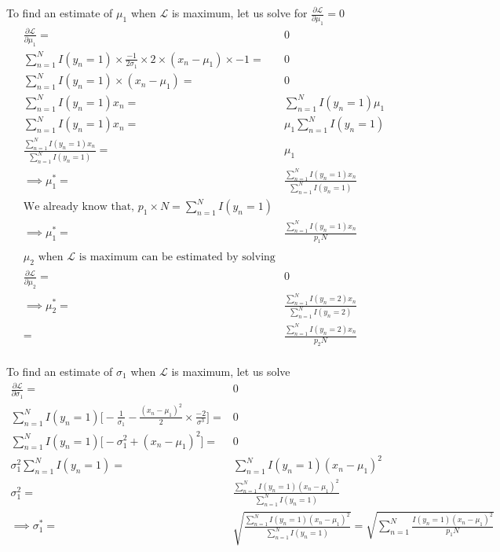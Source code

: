 \documentclass[letterpaper,doc,notimes]{apa6}
\begin{document}
{To find an estimate of $\mu_1$ when $\mathcal{L}$ is maximum, let us solve for $\frac{\partial \mathcal{L} }{\partial \mu_1} = 0$
\begin{align*}
\frac{\partial \mathcal{L} }{\partial \mu_1} =& 0 \\
	\sum_{n=1}^{N} I(y_n=1) \times \frac{-1}{2\sigma_1} \times 2 \times (x_n - \mu_1) \times -1 =& 0 \\
	\sum_{n=1}^{N} I(y_n=1) \times (x_n - \mu_1) =& 0 \\
		\sum_{n=1}^{N} I(y_n=1) x_n =&  \sum_{n=1}^{N} I(y_n=1) \mu_1 \\
				\sum_{n=1}^{N} I(y_n=1) x_n =& \mu_1 \sum_{n=1}^{N} I(y_n=1) \\
				\frac{ \sum_{n=1}^{N} I(y_n=1) x_n } {\sum_{n=1}^{N} I(y_n=1)}=& \mu_1  \\
				\implies \mu_1^* = & \frac{ \sum_{n=1}^{N} I(y_n=1) x_n } {\sum_{n=1}^{N} I(y_n=1)}  \\
		\text{We already know that, }  p_1 \times N = \sum_{n=1}^{N} I(y_n=1) & \\
	 \implies \mu_1^* = & \frac{ \sum_{n=1}^{N} I(y_n=1) x_n } {p_1 N} \\
	 \\
 \text{$\mu_2$ when $\mathcal{L}$ is maximum can be estimated by solving} & \\ \frac{\partial \mathcal{L} }{\partial \mu_2} = &0 \\
	 \implies \mu_2^* = & \frac{ \sum_{n=1}^{N} I(y_n=2) x_n } {\sum_{n=1}^{N} I(y_n=2)}  \\
	 	  = & \frac{ \sum_{n=1}^{N} I(y_n=2) x_n } {p_2 N} \\
\end{align*}

To find an estimate of $\sigma_1$ when $\mathcal{L}$ is maximum, let us solve
\begin{align*}
	\frac{\partial \mathcal{L} }{\partial \sigma_1} = &0  \\
	\sum_{n=1}^{N} I(y_n=1) \big[ -\frac{1}{\sigma_1} -\frac{(x_n - \mu_1)^2}{2} \times \frac{-2}{\sigma^3} \big] =& 0 \\
	\sum_{n=1}^{N} I(y_n=1) \big[ -\sigma_1^2 + (x_n - \mu_1)^2 \big] =& 0 \\
	\sigma_1^2 \sum_{n=1}^{N} I(y_n=1) =& \sum_{n=1}^{N} I(y_n=1) (x_n - \mu_1)^2 \\
    \sigma_1^2 =& \frac{ \sum_{n=1}^{N} I(y_n=1) (x_n - \mu_1)^2 }{\sum_{n=1}^{N} I(y_n=1)}\\
  \implies \sigma_1^* =& \sqrt{ \frac{ \sum_{n=1}^{N} I(y_n=1) (x_n - \mu_1)^2 }{\sum_{n=1}^{N} I(y_n=1)} } = \sqrt{ \sum_{n=1}^{N} \frac{ I(y_n=1) (x_n - \mu_1)^2 }{p_1 N} } \\
\end{align*}

}
\end{document}
